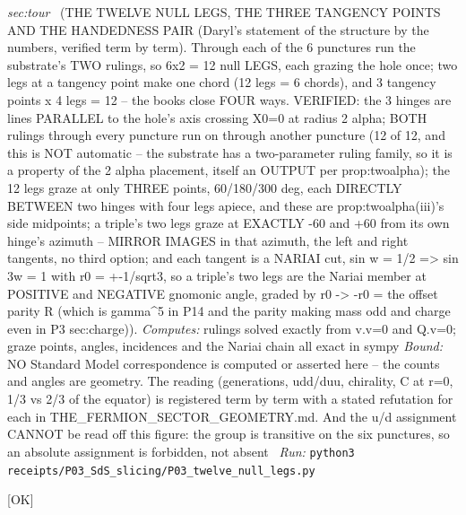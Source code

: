 \begin{description}
\textit{sec:tour} \ (THE TWELVE NULL LEGS, THE THREE TANGENCY POINTS AND THE HANDEDNESS PAIR (Daryl's statement of the structure by the numbers, verified term by term). Through each of the 6 punctures run the substrate's TWO rulings, so 6x2 = 12 null LEGS, each grazing the hole once; two legs at a tangency point make one chord (12 legs = 6 chords), and 3 tangency points x 4 legs = 12 -- the books close FOUR ways. VERIFIED: the 3 hinges are lines PARALLEL to the hole's axis crossing X0=0 at radius 2 alpha; BOTH rulings through every puncture run on through another puncture (12 of 12, and this is NOT automatic -- the substrate has a two-parameter ruling family, so it is a property of the 2 alpha placement, itself an OUTPUT per prop:twoalpha); the 12 legs graze at only THREE points, 60/180/300 deg, each DIRECTLY BETWEEN two hinges with four legs apiece, and these are prop:twoalpha(iii)'s side midpoints; a triple's two legs graze at EXACTLY -60 and +60 from its own hinge's azimuth -- MIRROR IMAGES in that azimuth, the left and right tangents, no third option; and each tangent is a NARIAI cut, sin w = 1/2 => sin 3w = 1 with r0 = +-1/sqrt3, so a triple's two legs are the Nariai member at POSITIVE and NEGATIVE gnomonic angle, graded by r0 -> -r0 = the offset parity R (which is gamma\textasciicircum{}5 in P14 and the parity making mass odd and charge even in P3 sec:charge)). 
\emph{Computes:} rulings solved exactly from v.v=0 and Q.v=0; graze points, angles, incidences and the Nariai chain all exact in sympy
 \emph{Bound:} NO Standard Model correspondence is computed or asserted here -- the counts and angles are geometry. The reading (generations, udd/duu, chirality, C at r=0, 1/3 vs 2/3 of the equator) is registered term by term with a stated refutation for each in THE\_FERMION\_SECTOR\_GEOMETRY.md. And the u/d assignment CANNOT be read off this figure: the group is transitive on the six punctures, so an absolute assignment is forbidden, not absent
\ \emph{Run:} \texttt{python3 receipts/P03\_SdS\_slicing/P03\_twelve\_null\_legs.py}
\item[\label{rcpt:P03_colour_spacelike_isospin_timelike}\texttt{P03\_colour\_spacelike\_isospin\_timelike}]\hfill\textsf{[OK]}\\

\end{description}
